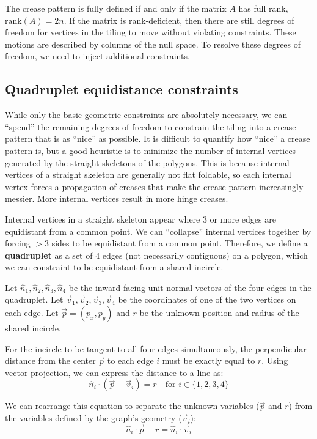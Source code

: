 \documentclass[11pt]{article}
\begin{document}
The crease pattern is fully defined if and only if the matrix $A$ has full rank, $\text{rank}(A) = 2n$. If the matrix is rank-deficient, then there are still degrees of freedom for vertices in the tiling to move without violating constraints. These motions are described by columns of the null space. To resolve these degrees of freedom, we need to inject additional constraints.

\subsection{Quadruplet equidistance constraints}
While only the basic geometric constraints are absolutely necessary, we can ``spend'' the remaining degrees of freedom to constrain the tiling into a crease pattern that is as ``nice'' as possible. It is difficult to quantify how ``nice'' a crease pattern is, but a good heuristic is to minimize the number of internal vertices generated by the straight skeletons of the polygons. This is because internal vertices of a straight skeleton are generally not flat foldable, so each internal vertex forces a propagation of creases that make the crease pattern increasingly messier. More internal vertices result in more hinge creases.

Internal vertices in a straight skeleton appear where 3 or more edges are equidistant from a common point. We can ``collapse'' internal vertices together by forcing $> 3$ sides to be equidistant from a common point. Therefore, we define a \textbf{quadruplet} as a set of 4 edges (not necessarily contiguous) on a polygon, which we can constraint to be equidistant from a shared incircle.

Let $\hat{n}_1, \hat{n}_2, \hat{n}_3, \hat{n}_4$ be the inward-facing unit normal vectors of the four edges in the quadruplet. Let $\vec{v}_1, \vec{v}_2, \vec{v}_3, \vec{v}_4$ be the coordinates of one of the two vertices on each edge. Let $\vec{p} = (p_x, p_y)$ and $r$ be the unknown position and radius of the shared incircle.

For the incircle to be tangent to all four edges simultaneously, the perpendicular distance from the center $\vec{p}$ to each edge $i$ must be exactly equal to $r$. Using vector projection, we can express the distance to a line as:
\begin{equation}
    \hat{n}_i \cdot (\vec{p} - \vec{v}_i) = r \quad \text{for } i \in \{1, 2, 3, 4\}
\end{equation}

We can rearrange this equation to separate the unknown variables ($\vec{p}$ and $r$) from the variables defined by the graph's geometry ($\vec{v}_i$):
\begin{equation}
    \hat{n}_i \cdot \vec{p} - r = \hat{n}_i \cdot \vec{v}_i
\end{equation}
\end{document}
